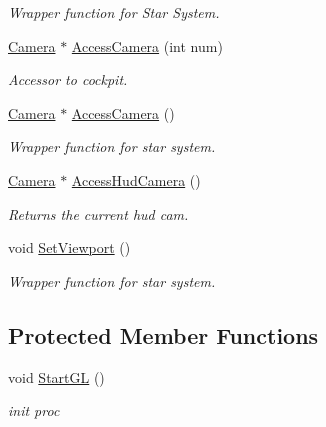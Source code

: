 \begin{DoxyCompactItemize}
\begin{DoxyCompactList}\small\item\em Wrapper function for Star System. \end{DoxyCompactList}\item 
\hyperlink{classCamera}{Camera} $\ast$ \hyperlink{classGameUniverse_a39a641088e1e94eff4b29d00c87dc930}{Access\+Camera} (int num)
\begin{DoxyCompactList}\small\item\em Accessor to cockpit. \end{DoxyCompactList}\item 
\hyperlink{classCamera}{Camera} $\ast$ \hyperlink{classGameUniverse_a5396db9ed4982fc978eb4467bfdee262}{Access\+Camera} ()\hypertarget{classGameUniverse_a5396db9ed4982fc978eb4467bfdee262}{}\label{classGameUniverse_a5396db9ed4982fc978eb4467bfdee262}

\begin{DoxyCompactList}\small\item\em Wrapper function for star system. \end{DoxyCompactList}\item 
\hyperlink{classCamera}{Camera} $\ast$ \hyperlink{classGameUniverse_a4b66bc4193207b91c3978045a0578b55}{Access\+Hud\+Camera} ()\hypertarget{classGameUniverse_a4b66bc4193207b91c3978045a0578b55}{}\label{classGameUniverse_a4b66bc4193207b91c3978045a0578b55}

\begin{DoxyCompactList}\small\item\em Returns the current hud cam. \end{DoxyCompactList}\item 
void \hyperlink{classGameUniverse_acf52d326b454289fcefbd8126b6fc185}{Set\+Viewport} ()\hypertarget{classGameUniverse_acf52d326b454289fcefbd8126b6fc185}{}\label{classGameUniverse_acf52d326b454289fcefbd8126b6fc185}

\begin{DoxyCompactList}\small\item\em Wrapper function for star system. \end{DoxyCompactList}\end{DoxyCompactItemize}
\subsection*{Protected Member Functions}
\begin{DoxyCompactItemize}
\item 
void \hyperlink{classGameUniverse_a4377ca9b4107bd0c5874379bf3dc9d2c}{Start\+GL} ()\hypertarget{classGameUniverse_a4377ca9b4107bd0c5874379bf3dc9d2c}{}\label{classGameUniverse_a4377ca9b4107bd0c5874379bf3dc9d2c}

\begin{DoxyCompactList}\small\item\em init proc \end{DoxyCompactList}\end{DoxyCompactItemize}
